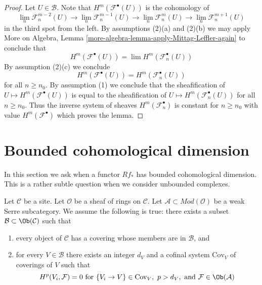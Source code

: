 \begin{proof}
Let $U \in \mathcal{B}$. Note that
$H^m(\mathcal{F}^\bullet(U))$ is the cohomology of
$$
\lim_n \mathcal{F}_n^{m - 2}(U) \to
\lim_n \mathcal{F}_n^{m - 1}(U) \to
\lim_n \mathcal{F}_n^m(U) \to
\lim_n \mathcal{F}_n^{m + 1}(U)
$$
in the third spot from the left. By assumptions (2)(a) and (2)(b)
we may apply
More on Algebra, Lemma \ref{more-algebra-lemma-apply-Mittag-Leffler-again}
to conclude that
$$
H^m(\mathcal{F}^\bullet(U)) = \lim H^m(\mathcal{F}_n^\bullet(U))
$$
By assumption (2)(c) we conclude
$$
H^m(\mathcal{F}^\bullet(U)) = H^m(\mathcal{F}_n^\bullet(U))
$$
for all $n \geq n_0$. By assumption (1) we conclude that the sheafification of
$U \mapsto H^m(\mathcal{F}^\bullet(U))$ is equal to the sheafification
of $U \mapsto H^m(\mathcal{F}_n^\bullet(U))$ for all $n \geq n_0$.
Thus the inverse system of sheaves $H^m(\mathcal{F}_n^\bullet)$ is
constant for $n \geq n_0$ with value $H^m(\mathcal{F}^\bullet)$ which
proves the lemma.
\end{proof}







\section{Bounded cohomological dimension}
\label{section-bounded}

\noindent
In this section we ask when a functor $Rf_*$ has
bounded cohomological dimension. This is a rather subtle question
when we consider unbounded complexes.

\begin{situation}
\label{situation-olsson-laszlo}
Let $\mathcal{C}$ be a site. Let $\mathcal{O}$ be a sheaf of rings on
$\mathcal{C}$. Let $\mathcal{A} \subset \textit{Mod}(\mathcal{O})$
be a weak Serre subcategory. We assume the following is true:
there exists a subset $\mathcal{B} \subset \Ob(\mathcal{C})$ such that
\begin{enumerate}
\item every object of $\mathcal{C}$ has a covering whose
members are in $\mathcal{B}$, and
\item for every $V \in \mathcal{B}$ there exists an integer $d_V$
and a cofinal system $\text{Cov}_V$ of coverings of $V$ such
that
$$
H^p(V_i, \mathcal{F}) = 0 \text{ for }
\{V_i \to V\} \in \text{Cov}_V,\ p > d_V, \text{ and }
\mathcal{F} \in \Ob(\mathcal{A})
$$
\end{enumerate}
\end{situation}

